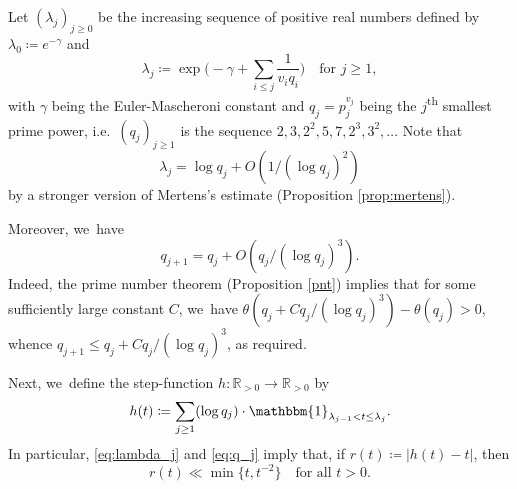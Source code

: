 \documentclass[10pt,a4paper]{amsart}
\providecommand{\ie}{i.e.\ }
\newcommand{\RR}{\mathbb{R}}
\newcommand{\one}{\mathbbm{1}}
\newcommand{\bgg}{\Big}
\theoremstyle{plain}
\theoremstyle{definition}
\providecommand{\ie}{i.e. }
\begin{document}
Let $(\lambda_j)_{j \ge 0}$ be the increasing sequence of positive real numbers defined by $\lambda_0 \coloneqq e^{-\gamma}$ and
\[
\lambda_j \coloneqq \exp\!\bgg(\!-\gamma+ \sum_{i \le j} \frac{1}{v_iq_i}\bgg)\quad \text{for $j \ge 1$},
\]
with $\gamma$ being the Euler-Mascheroni constant and $q_j = p_j^{v_j}$ being the $j$\textsuperscript{th} smallest prime power, \ie $(q_j)_{j \ge 1}$ is the sequence $2, 3, 2^2, 5, 7, 2^3, 3^2,\dots$ Note that
\begin{equation}
\label{eq:lambda_j}
\lambda_j = \log q_j +O(1/(\log q_j)^2)
\end{equation}
by a stronger version of Mertens's estimate (Proposition \ref{prop:mertens}).

Moreover, we~have
\begin{equation}
\label{eq:q_j}
q_{j+1} = q_j+O(q_j/(\log q_j)^3).
\end{equation}
Indeed, the prime number theorem (Proposition \ref{pnt}) implies that for some sufficiently large constant $C$, we~have $\theta(q_j+Cq_j/(\log q_j)^3) -\theta(q_j)>0$, whence $q_{j+1}\le q_j+Cq_j/(\log q_j)^3$, as required.

Next, we~define the step-function $h:\RR_{>0} \to \RR_{>0}$ by
\begin{equation}
\label{eq:h(t) dfn}
h(t) \coloneqq \sum_{j \ge 1} (\log q_j) \cdot \one_{\lambda_{j-1} < t \le \lambda_j}.
\end{equation}
In particular, \eqref{eq:lambda_j} and \eqref{eq:q_j} imply that, if $r(t) \coloneqq |h(t) - t|$, then
\begin{equation}
\label{eq:h(t) estimate}
r(t) \ll \min\{t, t^{-2}\} \quad \text{for all $t > 0$.}
\end{equation}
\end{document}
